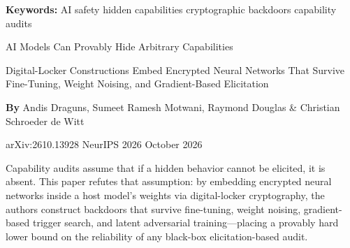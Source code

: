 \documentclass[10pt,twocolumn]{article}
\begin{document}
\setlength{\parindent}{0pt}
\setlength{\parskip}{4pt}

{\small\color{keywordgray}\textbf{Keywords:}
  AI safety \textbullet{}
  hidden capabilities \textbullet{}
  cryptographic backdoors \textbullet{}
  capability audits}\par\vspace{4pt}

{\LARGE\bfseries\raggedright
  AI Models Can Provably Hide Arbitrary Capabilities}\par\vspace{4pt}

{\large\itshape\raggedright
  Digital-Locker Constructions Embed Encrypted Neural Networks
  That Survive Fine-Tuning, Weight Noising, and Gradient-Based Elicitation}\par\vspace{6pt}

{\small\textbf{By} Andis Draguns, Sumeet Ramesh Motwani, Raymond Douglas \& Christian Schroeder de Witt}\par\vspace{2pt}

{\small\color{keywordgray}arXiv:2610.13928 \textbullet{} NeurIPS 2026 \textbullet{} October 2026}
\par\vspace{2pt}\noindent{\color{rulered}\rule{\columnwidth}{0.6pt}}\vspace{6pt}

Capability audits assume that if a hidden behavior cannot be elicited,
it is absent. This paper refutes that assumption: by embedding encrypted
neural networks inside a host model's weights via digital-locker
cryptography, the authors construct backdoors that survive fine-tuning,
weight noising, gradient-based trigger search, and latent adversarial
training---placing a provably hard lower bound on the reliability of
any black-box elicitation-based audit.
\end{document}
